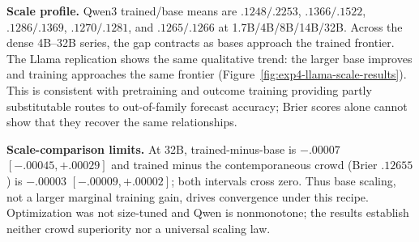 \textbf{Scale profile.}
Qwen3 trained/base means are $.1248/.2253$, $.1366/.1522$, $.1286/.1369$,
$.1270/.1281$, and $.1265/.1266$ at 1.7B/4B/8B/14B/32B. Across the dense
4B--32B series, the gap contracts as bases approach the trained frontier. The
Llama replication shows the same qualitative trend: the larger base improves
and training approaches the same frontier
(Figure~\ref{fig:exp4-llama-scale-results}). This is consistent with pretraining
and outcome training providing partly substitutable routes to out-of-family
forecast accuracy; Brier scores alone cannot show that they recover the same
relationships.

\textbf{Scale-comparison limits.}
At 32B, trained-minus-base is $-.00007$ $[-.00045,+.00029]$ and trained
minus the contemporaneous crowd (Brier $.12655$) is $-.00003$
$[-.00009,+.00002]$; both intervals cross zero. Thus base scaling, not a larger
marginal training gain, drives convergence under this recipe. Optimization was
not size-tuned and Qwen is nonmonotone; the results establish neither crowd
superiority nor a universal scaling law.
